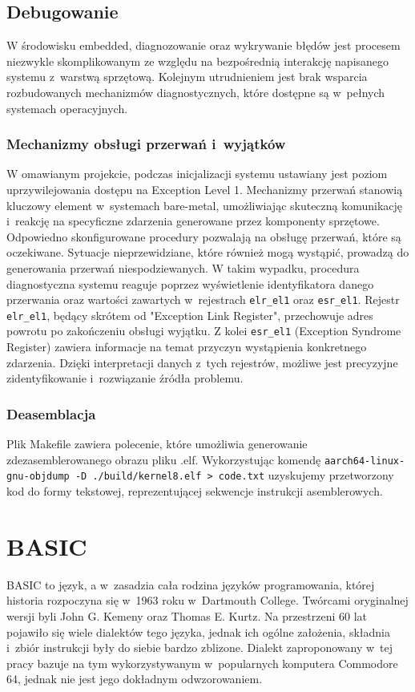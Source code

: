 \documentclass[shortabstract]{iithesis}
\begin{document}
\section{Debugowanie}
W środowisku embedded, diagnozowanie oraz wykrywanie błędów jest procesem niezwykle skomplikowanym ze względu na bezpośrednią interakcję napisanego systemu z~warstwą sprzętową. Kolejnym utrudnieniem jest brak wsparcia rozbudowanych mechanizmów diagnostycznych, które dostępne są w~pełnych systemach operacyjnych. 
\subsection{Mechanizmy obsługi przerwań i~wyjątków}
W omawianym projekcie, podczas inicjalizacji systemu ustawiany jest poziom uprzywilejowania dostępu na Exception Level 1. Mechanizmy przerwań stanowią kluczowy element w~systemach bare-metal, umożliwiając skuteczną komunikację i~reakcję na specyficzne zdarzenia generowane przez komponenty sprzętowe. Odpowiedno skonfigurowane procedury pozwalają na obsługę przerwań, które są oczekiwane.
Sytuacje nieprzewidziane, które również mogą wystąpić, prowadzą do generowania przerwań niespodziewanych. W takim wypadku, procedura diagnostyczna systemu reaguje poprzez wyświetlenie identyfikatora danego przerwania oraz wartości zawartych w~rejestrach \texttt{elr\_el1} oraz \texttt{esr\_el1}. Rejestr \texttt{elr\_el1}, będący skrótem od "Exception Link Register", przechowuje adres powrotu po zakończeniu obsługi wyjątku. Z kolei \texttt{esr\_el1} (Exception Syndrome Register) zawiera informacje na temat przyczyn wystąpienia konkretnego zdarzenia. Dzięki interpretacji danych z~tych rejestrów, możliwe jest precyzyjne zidentyfikowanie i~rozwiązanie źródła problemu.
\subsection{Deasemblacja}
Plik Makefile zawiera polecenie, które umożliwia generowanie zdezasemblerowanego obrazu pliku .elf. Wykorzystując komendę \texttt{aarch64-linux-gnu-objdump -D ./build/kernel8.elf > code.txt} uzyskujemy przetworzony kod do formy tekstowej, reprezentującej sekwencje instrukcji asemblerowych.


\chapter{BASIC}
BASIC to język, a w~zasadzia cała rodzina języków programowania, której historia rozpoczyna się w~1963 roku w~Dartmouth College. Twórcami oryginalnej wersji byli John G. Kemeny oraz Thomas E. Kurtz. Na przestrzeni 60 lat pojawiło się wiele dialektów tego języka, jednak ich ogólne założenia, składnia i~zbiór instrukcji były do siebie bardzo zblizone. Dialekt zaproponowany w~tej pracy bazuje na tym wykorzystywanym w~popularnych komputera Commodore 64, jednak nie jest jego dokładnym odwzorowaniem.
\end{document}
